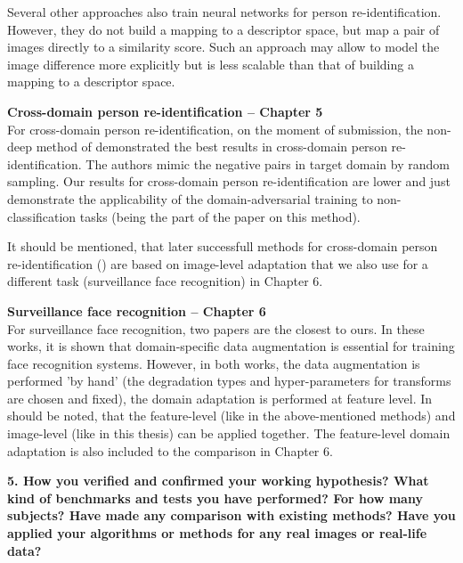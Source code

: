 \documentclass[a4paper, 11pt, oneside]{Thesis}  %
\begin{document}
Several other approaches \citep{Li14, ahmed2015improved, wu2016personnet} also train neural networks for person re-identification. However, they do not build a mapping to a descriptor space, but map a pair of images directly to a similarity score. Such an approach may allow to model the image difference more explicitly but is less scalable than that of building a mapping to a descriptor space. 




\textbf{Cross-domain person re-identification -- Chapter 5}\\
For cross-domain person re-identification, on the moment of submission, the non-deep method of \citet{MaLYL15} demonstrated the best results in cross-domain person re-identification. The authors mimic the negative pairs in target domain by random sampling. Our results for cross-domain person re-identification are lower and just demonstrate the applicability of the domain-adversarial training to non-classification tasks (being the part of the paper on this method).

It should be mentioned, that later successfull methods for cross-domain person re-identification (\citep{deng2018image}) are based on image-level adaptation that we also use for a different task (surveillance face recognition) in Chapter 6.

\textbf{Surveillance face recognition  -- Chapter 6}\\
For surveillance face recognition,
two papers \citep{HongIRY17,SohnLZY0C17} are the closest to ours. In these works, it is shown that domain-specific data augmentation is essential for training face recognition systems.  However, in both works, the data augmentation is performed 'by hand' (the degradation types and hyper-parameters for transforms are chosen and fixed), the domain adaptation is performed at feature level. In should be noted, that the feature-level (like in the above-mentioned methods) and image-level (like in this thesis) can be applied together. The feature-level domain adaptation is also included to the comparison in Chapter 6.

\bigskip\ident\textbf{
5. How you verified and confirmed your working hypothesis? What kind of benchmarks and tests
you have performed? For how many subjects?
Have made any comparison with existing methods? Have you applied your algorithms
or methods for any real images or real-life data?
}
\end{document}
